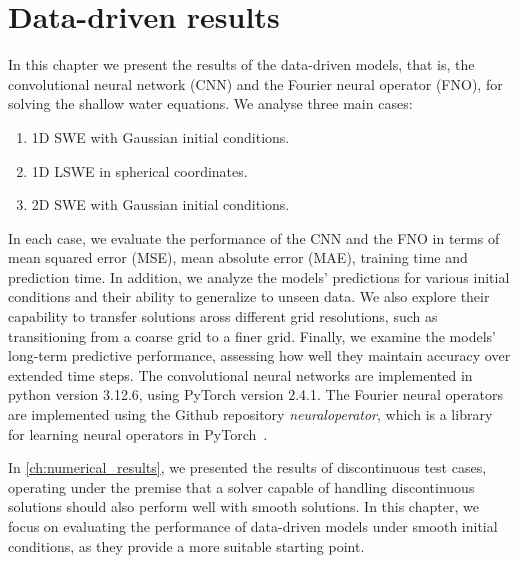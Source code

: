 \chapter{Data-driven results}\label{ch:data-driven-results}
In this chapter we present the results of the data-driven models, that is, the convolutional neural network (CNN) and the Fourier neural operator (FNO), for solving the shallow water equations.
We analyse three main cases:
\begin{enumerate}
    \item 1D SWE with Gaussian initial conditions. 
    \item 1D LSWE in spherical coordinates.
    \item 2D SWE with Gaussian initial conditions.
\end{enumerate}
In each case, we evaluate the performance of the CNN and the FNO in terms of mean squared error (MSE), mean absolute error (MAE), training time and prediction time.
In addition, we analyze the models' predictions for various initial conditions and their ability to generalize to unseen data.
We also explore their capability to transfer solutions aross different grid resolutions, such as transitioning from a coarse grid to a finer grid.
Finally, we examine the models' long-term predictive performance, assessing how well they maintain accuracy over extended time steps.
The convolutional neural networks are implemented in python version 3.12.6, using PyTorch version 2.4.1.
The Fourier neural operators are implemented using the Github repository \textit{neuraloperator}, which is a library for learning neural operators in PyTorch~\cite{neuraloperator}.

In \autoref{ch:numerical_results}, we presented the results of discontinuous test cases, operating under the premise that a solver capable of handling discontinuous solutions should also perform well with smooth solutions.
In this chapter, we focus on evaluating the performance of data-driven models under smooth initial conditions, as they provide a more suitable starting point.

